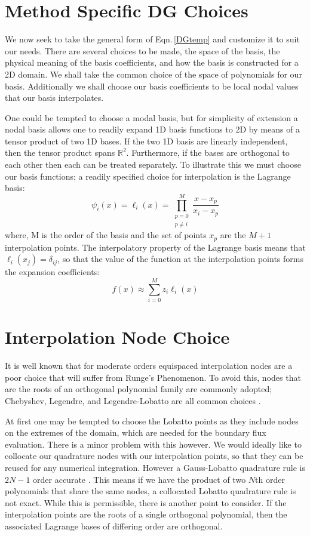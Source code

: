 \documentclass[letterpaper,12pt]{report}
\newcommand{\be}{\begin{equation}}
\newcommand{\ee}{\end{equation}}
\begin{document}
%
\section{Method Specific DG Choices} \label{DGchoice}
We now seek to take the general form of Eqn.\,\eqref{DGtemp} and customize it to suit our needs. There are several choices to be made, the space of the basis, the physical meaning of the basis coefficients, and how the basis is constructed for a 2D domain. We shall take the common choice of the space of polynomials for our basis. Additionally we shall choose our basis coefficients to be local nodal values that our basis interpolates.

One could be tempted to choose a modal basis, but for simplicity of extension a nodal basis allows one to readily expand 1D basis functions to 2D by means of a tensor product of two 1D bases. If the two 1D basis are linearly independent, then the tensor product spans $\mathbb{R}^2$. Furthermore, if the bases are orthogonal to each other then each can be treated separately. To illustrate this we must choose our basis functions; a readily specified choice for interpolation is the Lagrange basis:
\be \psi_i(x) =\ell_i(x) = \prod_{\substack{p=0\\ p\neq i}}^M \frac{x-x_p}{x_i-x_p}\ee
where, M is the order of the basis and the set of points ${x_p}$ are the $M+1$ interpolation points. The interpolatory property of the Lagrange basis means that $\ell_i(x_j) = \delta_{ij}$, so that the value of the function at the interpolation points forms the expansion coefficients:
\be f(x) \approx \sum_{i=0}^M z_i \ell_i(x) \ee

%
\section{Interpolation Node Choice}\label{INC}
It is well known that for moderate orders equispaced interpolation nodes are a poor choice that will suffer from Runge's Phenomenon. To avoid this, nodes that are the roots of an orthogonal polynomial family are commonly adopted; Chebyshev, Legendre, and Legendre-Lobatto are all common choices \cite{Roni}. 

At first one may be tempted to choose the Lobatto points as they include nodes on the extremes of the domain, which are needed for the boundary flux evaluation. There is a minor problem with this however. We would ideally like to collocate our quadrature nodes with our interpolation points, so that they can be reused for any numerical integration. However a Gauss-Lobatto quadrature rule is $2N-1$ order accurate \cite{Roni}. This means if we have the product of two $N$th order polynomials that share the same nodes, a collocated Lobatto quadrature rule is not exact. While this is permissible, there is another point to consider. If the interpolation points are the roots of a single orthogonal polynomial, then the associated Lagrange bases of differing order are orthogonal.
\end{document}
